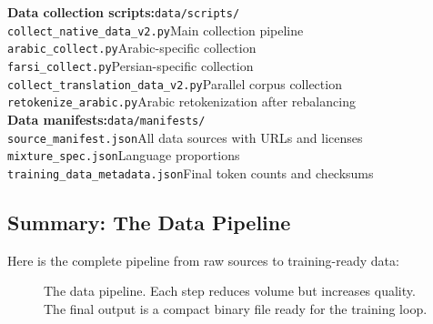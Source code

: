 \documentclass[11pt,a4paper]{article}
\begin{document}
\begin{reporef}
\textbf{Data collection scripts:}\hfill\texttt{data/scripts/}\\
\quad\texttt{collect\_native\_data\_v2.py}\hfill Main collection pipeline\\
\quad\texttt{arabic\_collect.py}\hfill Arabic-specific collection\\
\quad\texttt{farsi\_collect.py}\hfill Persian-specific collection\\
\quad\texttt{collect\_translation\_data\_v2.py}\hfill Parallel corpus collection\\
\quad\texttt{retokenize\_arabic.py}\hfill Arabic retokenization after rebalancing\\
[6pt]
\textbf{Data manifests:}\hfill\texttt{data/manifests/}\\
\quad\texttt{source\_manifest.json}\hfill All data sources with URLs and licenses\\
\quad\texttt{mixture\_spec.json}\hfill Language proportions\\
\quad\texttt{training\_data\_metadata.json}\hfill Final token counts and checksums\\
\end{reporef}

\subsection{Summary: The Data Pipeline}

Here is the complete pipeline from raw sources to training-ready data:

\begin{figure}[H]
\centering
{}
\caption{The data pipeline. Each step reduces volume but increases quality. The final output is a compact binary file ready for the training loop.}
\label{fig:data_pipeline}
\end{figure}
\end{document}
